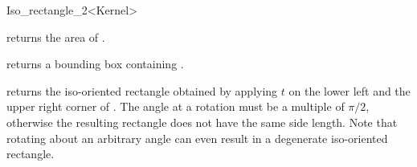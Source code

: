 \begin{ccRefClass} {Iso_rectangle_2<Kernel>}
       {}
\ccGlue
{}
       {}
\ccGlue
{}
       {}


       {returns the area of \ccVar. }

       {returns a bounding box containing \ccVar. }

       {returns the iso-oriented rectangle obtained by applying $t$ on 
        the lower left and the upper right corner of \ccVar.
        \ccPrecond The angle at a rotation must be a multiple of $\pi/2$,
        otherwise the resulting rectangle does not have the same side length.
        Note that rotating about an arbitrary angle can even result in
        a degenerate  iso-oriented rectangle.}



\ccSeeAlso
{}

\end{ccRefClass} 
